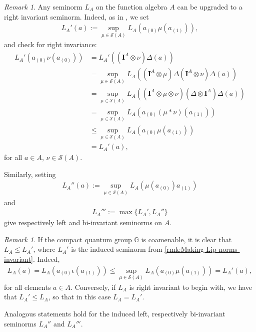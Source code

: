 \documentclass{amsart}
\theoremstyle{plain}
\theoremstyle{definition}
\theoremstyle{remark}
\newtheorem{remark}[theorem]{Remark}
\begin{document}
	\begin{remark}\label{rmk:Making-Lip-norms-invariant}
		Any seminorm $L_A$ on the function algebra $A$ can be upgraded to a right invariant seminorm.
		Indeed, as in \cite[Proposition 8.9]{Li09}, we set
		\begin{align}
			L_A'(a) := \sup_{\mu \in \mathcal{S}(A)} L_A (a_{(0)}\mu(a_{(1)})),
		\end{align}
		and check for right invariance:
		\begin{align}
			L_A'(a_{(0)}\nu(a_{(0)}))
			&= L_A'((\mathbf{I}^A \otimes \nu) \Delta(a)) \\
			&= \sup_{\mu \in \mathcal{S}(A)} L_A((\mathbf{I}^A \otimes \mu) \Delta (\mathbf{I}^A \otimes \nu) \Delta (a)) \\
			&= \sup_{\mu \in \mathcal{S}(A)} L_A((\mathbf{I}^A \otimes \mu \otimes \nu) (\Delta \otimes \mathbf{I}^A) \Delta (a)) \\
			&= \sup_{\mu \in \mathcal{S}(A)} L_A(a_{(0)} (\mu \ast \nu) (a_{(1)})) \\
			&\leq \sup_{\mu \in \mathcal{S}(A)} L_A(a_{(0)} \mu (a_{(1)})) \\
			&= L_A'(a),
		\end{align}
		for all $a \in A$, $\nu \in \mathcal{S}(A)$.
		
		Similarly, setting
		\begin{align}
			L_A''(a) := \sup_{\mu \in \mathcal{S}(A)} L_A (\mu(a_{(0)})a_{(1)})
		\end{align}
		and 
		\begin{align}
			L_A''' := \max\{L_A',L_A''\}
		\end{align}
		give respectively left and bi-invariant seminorms on $A$.
	\end{remark}
	
	\begin{remark}\label{rmk:Invariant-seminorms-coamenable-case}
		If the compact quantum group $\mathbb{G}$ is coamenable, it is clear that $L_A \leq L_A'$, where $L_A'$ is the induced seminorm from \autoref{rmk:Making-Lip-norms-invariant}.
		Indeed, 
		\begin{align}
			L_A(a) = L_A(a_{(0)}\epsilon(a_{(1)})) \leq \sup_{\mu \in \mathcal{S}(A)} L_A(a_{(0)}\mu(a_{(1)}))
			= L_A'(a),
		\end{align}
		for all elements $a \in A$.
		Conversely, if $L_A$ is right invariant to begin with, we have that $L_A' \leq L_A$, so that in this case $L_A = L_A'$.
		
		Analogous statements hold for the induced left, respectively bi-invariant seminorms $L_A''$ and $L_A'''$.
	\end{remark}
	
\end{document}

